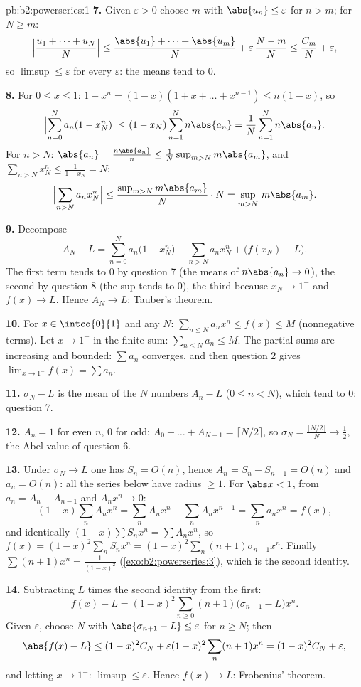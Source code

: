 \begin{solution}{pb:b2:powerseries:1}
\textbf{7.} Given $\varepsilon > 0$ choose $m$ with $\abs{u_n}
\leq \varepsilon$ for $n > m$; for $N \geq m$:
\[
\Bigl|\frac{u_1 + \dots + u_N}{N}\Bigr|
\leq \frac{\abs{u_1} + \dots + \abs{u_m}}{N} +
\varepsilon\,\frac{N - m}{N}
\leq \frac{C_m}{N} + \varepsilon,
\]
so $\limsup \leq \varepsilon$ for every $\varepsilon$: the
means tend to $0$.

\textbf{8.} For $0 \leq x \leq 1$: $1 - x^n = (1-x)(1 + x +
\dots + x^{n-1}) \leq n(1-x)$, so
\[
\Bigl|\sum_{n=0}^N a_n(1 - x_N^n)\Bigr|
\leq (1 - x_N)\sum_{n=1}^N n\abs{a_n}
= \frac1N\sum_{n=1}^{N}n\abs{a_n} .
\]
For $n > N$: $\abs{a_n} = \frac{n\abs{a_n}}{n} \leq
\frac{1}{N}\sup_{m>N}m\abs{a_m}$, and $\sum_{n>N}x_N^n \leq
\frac{1}{1 - x_N} = N$:
\[
\Bigl|\sum_{n>N}a_nx_N^n\Bigr|
\leq \frac{\sup_{m>N}m\abs{a_m}}{N}\cdot N
= \sup_{m>N}\,m\abs{a_m} .
\]

\textbf{9.} Decompose
\[
A_N - L = \sum_{n=0}^{N}a_n\bigl(1 - x_N^n\bigr)
- \sum_{n>N}a_nx_N^n + \bigl(f(x_N) - L\bigr) .
\]
The first term tends to $0$ by question 7 (the means of
$n\abs{a_n} \to 0$), the second by question 8 (the sup tends to
$0$), the third because $x_N \to 1^-$ and $f(x) \to L$. Hence
$A_N \to L$: Tauber's theorem.

\textbf{10.} For $x \in \intco{0}{1}$ and any $N$:
$\sum_{n\leq N}a_nx^n \leq f(x) \leq M$ (nonnegative terms).
Let $x \to 1^-$ in the finite sum: $\sum_{n\leq N}a_n \leq M$.
The partial sums are increasing and bounded: $\sum a_n$
converges, and then question 2 gives $\lim_{x\to1^-}f(x) =
\sum a_n$.

\textbf{11.} $\sigma_N - L$ is the mean of the $N$ numbers
$A_n - L$ ($0 \leq n < N$), which tend to $0$: question 7.

\textbf{12.} $A_n = 1$ for even $n$, $0$ for odd: $A_0 + \dots
+ A_{N-1} = \lceil N/2\rceil$, so $\sigma_N =
\frac{\lceil N/2\rceil}{N} \to \frac12$, the Abel value of
question 6.

\textbf{13.} Under $\sigma_N \to L$ one has $S_n = O(n)$, hence
$A_n = S_n - S_{n-1} = O(n)$ and $a_n = O(n)$: all the series
below have radius $\geq 1$. For $\abs x < 1$, from $a_n = A_n -
A_{n-1}$ and $A_nx^n \to 0$:
\[
(1-x)\sum_n A_nx^n = \sum_n A_nx^n - \sum_n A_nx^{n+1}
= \sum_n a_nx^n = f(x),
\]
and identically $(1-x)\sum S_nx^n = \sum A_nx^n$, so $f(x) =
(1-x)^2\sum_n S_nx^n = (1-x)^2\sum_n(n+1)\sigma_{n+1}x^n$.
Finally $\sum(n+1)x^n = \frac{1}{(1-x)^2}$
(\cref{exo:b2:powerseries:3}), which is the second identity.

\textbf{14.} Subtracting $L$ times the second identity from the
first:
\[
f(x) - L = (1-x)^2\sum_{n\geq0}(n+1)
\bigl(\sigma_{n+1} - L\bigr)x^n .
\]
Given $\varepsilon$, choose $N$ with $\abs{\sigma_{n+1} - L}
\leq \varepsilon$ for $n \geq N$; then
\[
\abs{f(x) - L} \leq (1-x)^2 C_N +
\varepsilon(1-x)^2\sum_{n}(n+1)x^n
= (1-x)^2C_N + \varepsilon ,
\]
and letting $x \to 1^-$: $\limsup \leq \varepsilon$. Hence
$f(x) \to L$: Frobenius' theorem.


\end{solution}
